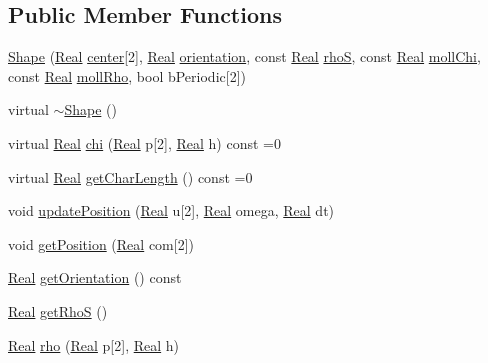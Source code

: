 \subsection*{Public Member Functions}
\begin{DoxyCompactItemize}
\item 
\hyperlink{class_shape_a5569f27971a19b8a929c98715c73e357}{Shape} (\hyperlink{_h_d_f5_dumper_8h_a445a5f0e2a34c9d97d69a3c2d1957907}{Real} \hyperlink{class_shape_a865a04fe67fc785b3cbb44806a214248}{center}\mbox{[}2\mbox{]}, \hyperlink{_h_d_f5_dumper_8h_a445a5f0e2a34c9d97d69a3c2d1957907}{Real} \hyperlink{class_shape_a1778439509ada1f3fa64472610221d19}{orientation}, const \hyperlink{_h_d_f5_dumper_8h_a445a5f0e2a34c9d97d69a3c2d1957907}{Real} \hyperlink{class_shape_a181acdc3063f20a15ba1807f7b6a5d10}{rho\+S}, const \hyperlink{_h_d_f5_dumper_8h_a445a5f0e2a34c9d97d69a3c2d1957907}{Real} \hyperlink{class_shape_ad7d270a8ffc4056d4990424dffdd0488}{moll\+Chi}, const \hyperlink{_h_d_f5_dumper_8h_a445a5f0e2a34c9d97d69a3c2d1957907}{Real} \hyperlink{class_shape_af5aa25175d49bc463fada7b11f2735e1}{moll\+Rho}, bool b\+Periodic\mbox{[}2\mbox{]})
\item 
virtual \hyperlink{class_shape_ac3b9fc48965274893f25b18aa14ba665}{$\sim$\+Shape} ()
\item 
virtual \hyperlink{_h_d_f5_dumper_8h_a445a5f0e2a34c9d97d69a3c2d1957907}{Real} \hyperlink{class_shape_aafa14cb6631bdc7a7a775e83a4bf5cdf}{chi} (\hyperlink{_h_d_f5_dumper_8h_a445a5f0e2a34c9d97d69a3c2d1957907}{Real} p\mbox{[}2\mbox{]}, \hyperlink{_h_d_f5_dumper_8h_a445a5f0e2a34c9d97d69a3c2d1957907}{Real} h) const =0
\item 
virtual \hyperlink{_h_d_f5_dumper_8h_a445a5f0e2a34c9d97d69a3c2d1957907}{Real} \hyperlink{class_shape_a702acbc7c7ac03d89a994404569f173f}{get\+Char\+Length} () const =0
\item 
void \hyperlink{class_shape_a65aa567330590a20cbda09e592e5f862}{update\+Position} (\hyperlink{_h_d_f5_dumper_8h_a445a5f0e2a34c9d97d69a3c2d1957907}{Real} u\mbox{[}2\mbox{]}, \hyperlink{_h_d_f5_dumper_8h_a445a5f0e2a34c9d97d69a3c2d1957907}{Real} omega, \hyperlink{_h_d_f5_dumper_8h_a445a5f0e2a34c9d97d69a3c2d1957907}{Real} dt)
\item 
void \hyperlink{class_shape_a9bd42ded0d37d57cd2c926981fe9cec9}{get\+Position} (\hyperlink{_h_d_f5_dumper_8h_a445a5f0e2a34c9d97d69a3c2d1957907}{Real} com\mbox{[}2\mbox{]})
\item 
\hyperlink{_h_d_f5_dumper_8h_a445a5f0e2a34c9d97d69a3c2d1957907}{Real} \hyperlink{class_shape_ae79a82f1fa1a88c95927f02f8664f843}{get\+Orientation} () const 
\item 
\hyperlink{_h_d_f5_dumper_8h_a445a5f0e2a34c9d97d69a3c2d1957907}{Real} \hyperlink{class_shape_a9c55b7360f7439a7b422424a34b5713f}{get\+Rho\+S} ()
\item 
\hyperlink{_h_d_f5_dumper_8h_a445a5f0e2a34c9d97d69a3c2d1957907}{Real} \hyperlink{class_shape_af43ed0f7e4b90ba50be1c9ea05451353}{rho} (\hyperlink{_h_d_f5_dumper_8h_a445a5f0e2a34c9d97d69a3c2d1957907}{Real} p\mbox{[}2\mbox{]}, \hyperlink{_h_d_f5_dumper_8h_a445a5f0e2a34c9d97d69a3c2d1957907}{Real} h)
\end{DoxyCompactItemize}
